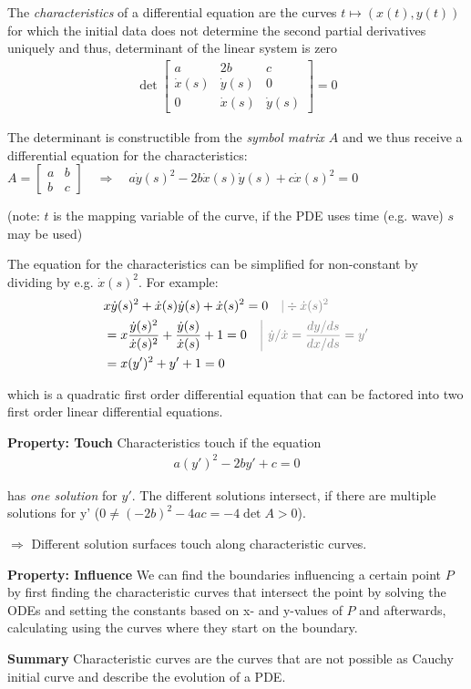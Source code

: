 The \emph{characteristics} of a differential equation are the curves $t\mapsto(x(t),y(t))$ for which the initial data
does not determine the second partial derivatives uniquely and thus, determinant of the linear system is zero
\begin{align*}
    \det
    \begin{bmatrix}
        a & 2b & c \\
        \dot{x}(s) & \dot{y}(s) & 0 \\
        0 & \dot{x}(s) & \dot{y}(s)
    \end{bmatrix}
    = 0
\end{align*}

The determinant is constructible from the \emph{symbol matrix $A$} and we thus receive a differential equation for the characteristics:
\colorbox{shadecolor}{$
    \displaystyle
    A = \begin{bmatrix}
        a & b \\
        b & c
    \end{bmatrix}
    \quad\Rightarrow\quad
    a\dot{y}(s)^2 - 2b\dot{x}(s)\dot{y}(s) + c\dot{x}(s)^2 = 0
$}

(note: $t$ is the mapping variable of the curve, if the PDE uses time (e.g. wave) $s$ may be used)

The equation for the characteristics can be simplified for non-constant by dividing by e.g. $\dot{x}(s)^2$. For example:
\begin{align*}
    & x\dot{y}(s)^{2}+\dot{x}(s)\dot{y}(s)+\dot{x}(s)^{2}=0\quad{\color{gray}|\div \dot{x}(s)^2} \\
    & = x\frac{\dot{y}(s)^{2}}{\dot{x}(s)^{2}}+\frac{\dot{y}(s)}{\dot{x}(s)}+1=0
    \quad {\color{gray} \left|\ \dot{y}/\dot{x} = \frac{dy/ds}{dx/ds} = y' \right.} \\
    & = x(y')^2 + y' + 1 = 0
\end{align*}

which is a quadratic first order differential equation that can be factored into two first order linear differential equations.

\textbf{Property: Touch} Characteristics touch if the equation
\begin{align*}
    a(y')^2 - 2by' + c = 0
\end{align*}

has \emph{one solution} for $y'$. The different solutions intersect, if there are multiple solutions for y'
($0\neq (-2b)^2-4ac = -4\det A > 0$).

$\Rightarrow$ Different solution surfaces touch along characteristic curves.

\textbf{Property: Influence} We can find the boundaries influencing a certain point $P$ by first finding the
characteristic curves that intersect the point by solving the ODEs and setting the constants based on x- and y-values of
$P$ and afterwards, calculating using the curves where they start on the boundary.

\textbf{Summary} Characteristic curves are the curves that are not possible as Cauchy initial curve and describe the
evolution of a PDE.
